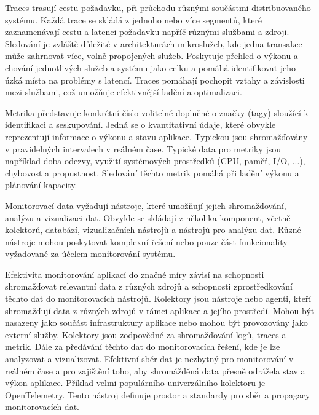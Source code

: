 
Traces trasují cestu požadavku, při průchodu různými součástmi distribuovaného systému. Každá trace se skládá z jednoho nebo více segmentů, které zaznamenávají cestu a latenci požadavku napříč různými službami a zdroji. Sledování je zvláště důležité v architekturách mikroslužeb, kde jedna transakce může zahrnovat více, volně propojených služeb. Poskytuje přehled o výkonu a chování jednotlivých služeb a systému jako celku a pomáhá identifikovat jeho úzká místa na problémy s latencí. \cite{Molkova2023} Traces pomáhají pochopit vztahy a závislosti mezi službami, což umožňuje efektivnější ladění a optimalizaci.


Metrika představuje konkrétní číslo volitelně doplněné o značky (tagy) sloužící k identifikaci a seskupování. \cite{Majors2022} Jedná se o kvantitativní údaje, které obvykle reprezentují informace o výkonu a stavu aplikace. Typickou jsou shromažďovány v pravidelných intervalech v reálném čase. Typické data pro metriky jsou například doba odezvy, využití systémových prostředků (CPU, paměť, I/O, ...), chybovost a propustnost. Sledování těchto metrik pomáhá při ladění výkonu a plánování kapacity.


Monitorovací data vyžadují nástroje, které umožňují jejich shromažďování, analýzu a vizualizaci dat. Obvykle se skládají z několika komponent, včetně kolektorů, databází, vizualizačních nástrojů a nástrojů pro analýzu dat. Různé nástroje mohou poskytovat komplexní řešení nebo pouze část funkcionality vyžadované za účelem monitorování systému. \cite{Riedesel2021}


Efektivita monitorování aplikací do značné míry závisí na schopnosti shromažďovat relevantní data z různých zdrojů a schopnosti zprostředkování těchto dat do monitorovacích nástrojů. Kolektory jsou nástroje nebo agenti, kteří shromažďují data z různých zdrojů v rámci aplikace a jejího prostředí. \cite{Blanco2023} Mohou být nasazeny jako součást infrastruktury aplikace nebo mohou být provozovány jako externí služby. Kolektory jsou zodpovědné za shromažďování logů, traces a metrik. Dále za předávání těchto dat do monitorovacích řešení, kde je lze analyzovat a vizualizovat. Efektivní sběr dat je nezbytný pro monitorování v reálném čase a pro zajištění toho, aby shromážděná data přesně odrážela stav a výkon aplikace. Příklad velmi populárního univerzálního kolektoru je OpenTelemetry. Tento nástroj definuje prostor a standardy pro sběr a propagacy monitorovacích dat. \cite{Blanco2023}

